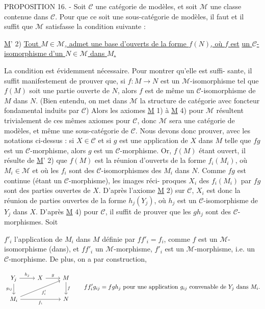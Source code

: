 PROPOSITION 16. - Soit $\mathcal{C}$ une catégorie de modèles, et soit $\mathcal{M}$ une classe
contenue dans $\mathcal{C}$. Pour que ce soit une sous-catégorie de modèles, il
faut et il suffit que $\mathcal{M}$ satisfasse la condition suivante :

\underline{M}' 2) \underline{Tout $M \in \mathcal{M}$, admet une base d'ouverts de la forme $f(N)$, où $f$ est}
\indent \indent \underline{un $\mathcal{C}$-isomorphisme d'un $N \in \mathcal{M}$ dans $M$.}

La condition est évidemment nécessaire. Pour montrer qu'elle est suffi-
sante, il suffit manifestement de prouver que, si $f: M \to N$ est un
$\mathcal{M}$-isomorphisme tel que $f(M)$ soit une partie ouverte de $N$, alors $f$
est de même un $\mathcal{C}$-isomorphisme de $M$ dans $N$. (Bien entendu, on met dans
$\mathcal{M}$ la structure de catégorie avec foncteur fondamental induits par $\mathcal{C}$)
Alors les axiomes \underline{M} 1) à \underline{M} 4) pour $\mathcal{M}$ résultent trivialement de ces
mêmes axiomes pour $\mathcal{C}$, donc $\mathcal{M}$ sera une catégorie de modèles, et même
une sous-catégorie de $\mathcal{C}$. Nous devons donc prouver, avec les notations
ci-dessus : si $X \in \mathcal{C}$ et si $g$ est une application de $X$ dans $M$ telle que
$f g$ est un $\mathcal{C}$-morphisme, alors $g$ est un $\mathcal{C}$-morphisme. Or, $f(M)$ étant
ouvert, il résulte de \underline{M}' 2) que $f(M)$ est la réunion d'ouverts de la
forme $f_i(M_i)$, où $M_i \in \mathcal{M}$ et où les $f_i$ sont des $\mathcal{C}$-isomorphismes des $M_i$
dans $N$. Comme $f g$ est continue (étant un $\mathcal{C}$-morphisme), les images réci-
proques $X_i$ des $f_i(M_i)$ par $f g$ sont des parties ouvertes de $X$. D'après
l'axiome \underline{M} 2) sur $\mathcal{C}$, $X_i$ est donc la réunion de parties ouvertes de la
forme $h_j(Y_j)$, où $h_j$ est un $\mathcal{C}$-isomorphisme de $Y_j$ dans $X$. D'après \underline{M} 4)
pour $\mathcal{C}$, il suffit de prouver que les $g h_j$ sont des $\mathcal{C}$-morphismes. Soit

\newpage



$f'_i$ l'application de $M_i$ dans $M$ définie par $ff'_i = f_i$, comme $f$ est un $\mathcal{M}$-isomorphisme (dans), et $ff'_i$ un $\mathcal{M}$-morphisme, $f'_i$ est un $\mathcal{M}$-morphisme, i.e. un $\mathcal{C}$-morphisme. De plus, on a par construction,

\[
\begin{tikzcd}
Y_j \arrow[r, "h_j"] \arrow[d, "g_{ij}"'] & X \arrow[r, "g"] & M \arrow[d, "f"] \\
M_i \arrow[urr, "f'_i"'] \arrow[rr, "f_i"'] & & N
\end{tikzcd}
\qquad
\text{$f f'_i g_{ij} = f g h_j$ pour une application $g_{ij}$ convenable de $Y_j$ dans $M_i$.}
\]

